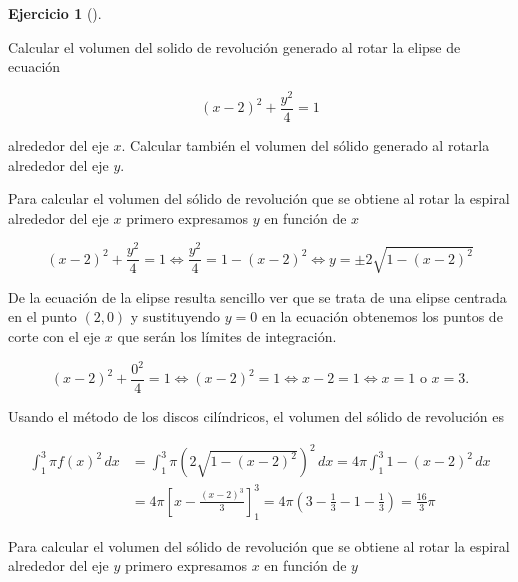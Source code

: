 \documentclass[
  a4paper,
]{scrreport}
\theoremstyle{definition}
\newtheorem{exercise}{Ejercicio}[chapter]
\theoremstyle{remark}
\begin{document}
\begin{exercise}[]\protect\hypertarget{exr-3}{}\label{exr-3}

Calcular el volumen del solido de revolución generado al rotar la elipse
de ecuación

\[
(x-2)^2 + \frac{y^2}{4} = 1
\]

alrededor del eje \(x\). Calcular también el volumen del sólido generado
al rotarla alrededor del eje \(y\).

\end{exercise}

\begin{tcolorbox}[enhanced jigsaw, opacityback=0, bottomtitle=1mm, coltitle=black, opacitybacktitle=0.6, colback=white, breakable, left=2mm, titlerule=0mm, bottomrule=.15mm, colbacktitle=quarto-callout-tip-color!10!white, toprule=.15mm, leftrule=.75mm, arc=.35mm, toptitle=1mm, colframe=quarto-callout-tip-color-frame, title=\textcolor{quarto-callout-tip-color}{\faLightbulb}\hspace{0.5em}{Solución}, rightrule=.15mm]

Para calcular el volumen del sólido de revolución que se obtiene al
rotar la espiral alrededor del eje \(x\) primero expresamos \(y\) en
función de \(x\)

\[
(x-2)^2+\frac{y^2}{4} = 1 
\Leftrightarrow  \frac{y^2}{4} = 1-(x-2)^2
\Leftrightarrow y = \pm 2\sqrt{1-(x-2)^2}
\]

De la ecuación de la elipse resulta sencillo ver que se trata de una
elipse centrada en el punto \((2,0)\) y sustituyendo \(y=0\) en la
ecuación obtenemos los puntos de corte con el eje \(x\) que serán los
límites de integración.

\[
(x-2)^2 + \frac{0^2}{4} = 1 
\Leftrightarrow (x-2)^2 = 1
\Leftrightarrow x-2 = 1
\Leftrightarrow  x=1 \mbox{ o } x=3.
\]

Usando el método de los discos cilíndricos, el volumen del sólido de
revolución es

\begin{align*}
\int_1^3 \pi f(x)^2\,dx 
&= \int_1^3 \pi \left(2\sqrt{1-(x-2)^2}\right)^2\,dx
= 4\pi \int_1^3 1-(x-2)^2\,dx \\
&= 4\pi \left[x-\frac{(x-2)^3}{3}\right]_1^3 
= 4\pi \left(3-\frac{1}{3} - 1 -\frac{1}{3}\right) 
= \frac{16}{3}\pi
\end{align*}

Para calcular el volumen del sólido de revolución que se obtiene al
rotar la espiral alrededor del eje \(y\) primero expresamos \(x\) en
función de \(y\)


\end{tcolorbox}
\end{document}
